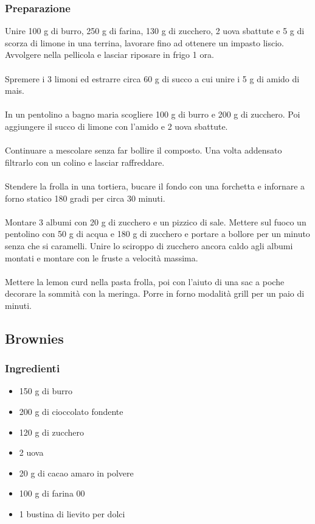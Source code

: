 \documentclass[12pt, a4paper]{article}
\begin{document}
\subsubsection{Preparazione}
Unire 100 g di burro, 250 g di farina, 130 g di zucchero, 2 uova sbattute e 5 g di scorza di limone in
una terrina, lavorare fino ad ottenere un impasto liscio. Avvolgere nella pellicola e lasciar riposare in frigo
1 ora.\\\\
Spremere i 3 limoni ed estrarre circa 60 g di succo a cui unire i 5 g di amido di mais.\\\\
In un pentolino a bagno maria scogliere 100 g di burro e 200 g di zucchero. Poi aggiungere il succo di limone con
l'amido e 2 uova sbattute.\\\\
Continuare a mescolare senza far bollire il composto. Una volta addensato filtrarlo con un colino e 
lasciar raffreddare.\\\\
Stendere la frolla in una tortiera, bucare il fondo con una forchetta e infornare a forno statico 180 gradi per circa 30 minuti.\\\\
Montare 3 albumi con 20 g di zucchero e un pizzico di sale. Mettere sul fuoco un pentolino con 50 g di acqua e 180 g di zucchero e
portare a bollore per un minuto senza che si caramelli. Unire lo sciroppo di zucchero ancora caldo agli albumi montati e montare con le
fruste a velocità massima.\\\\
Mettere la lemon curd nella pasta frolla, poi con l'aiuto di una sac a poche decorare la sommità con la meringa. Porre in forno modalità
grill per un paio di minuti.
\clearpage

\subsection{Brownies}

\subsubsection{Ingredienti}
\begin{itemize}
\item   150 g di burro
\item	200 g di cioccolato fondente
\item	120 g di zucchero
\item	2 uova
\item	20 g di cacao amaro in polvere
\item	100 g di farina 00
\item	1 bustina di lievito per dolci
\end{itemize}
\end{document}
